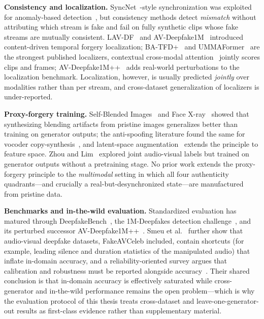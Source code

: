 \textbf{Consistency and localization.} SyncNet~\cite{chung2016syncnet}-style
synchronization was exploited for anomaly-based detection~\cite{feng2023avanomaly},
but consistency methods detect \emph{mismatch} without attributing which stream
is fake and fail on fully synthetic clips whose fake streams are mutually
consistent. LAV-DF~\cite{cai2022lavdf} and
AV-Deepfake1M~\cite{cai2023avdeepfake1m} introduced content-driven temporal
forgery localization; BA-TFD+~\cite{cai2023batfdplus} and
UMMAFormer~\cite{zhang2023ummaformer} are the strongest published localizers,
contextual cross-modal attention~\cite{katamneni2024contextual} jointly scores
clips and frames; AV-Deepfake1M++~\cite{cai2025avdeepfake1mpp} adds real-world
perturbations to the localization benchmark.
Localization, however, is usually predicted \emph{jointly} over modalities
rather than per stream, and cross-dataset generalization of localizers is
under-reported.

\textbf{Proxy-forgery training.} Self-Blended Images~\cite{shiohara2022sbi} and
Face X-ray~\cite{li2020facexray} showed that synthesizing blending artifacts
from pristine images generalizes better than training on generator outputs; the
anti-spoofing literature found the same for vocoder
copy-synthesis~\cite{wang2023vocoded}, and latent-space
augmentation~\cite{yan2024lsda} extends the principle to feature space.
Zhou and Lim~\cite{zhou2021joint} explored joint audio-visual labels but
trained on generator outputs without a pretraining stage. No prior work
extends the proxy-forgery principle to the \emph{multimodal} setting in which
all four authenticity quadrants---and crucially a real-but-desynchronized
state---are manufactured from pristine data.

\textbf{Benchmarks and in-the-wild evaluation.} Standardized evaluation has
matured through DeepfakeBench~\cite{yan2023deepfakebench}, the 1M-Deepfakes
detection challenge~\cite{cai2024challenge}, and its perturbed successor
AV-Deepfake1M++~\cite{cai2025avdeepfake1mpp}. Smeu et
al.~\cite{smeu2025shortcuts} further show that audio-visual deepfake datasets,
FakeAVCeleb included, contain shortcuts (for example, leading silence and
duration statistics of the manipulated audio) that inflate in-domain
accuracy, and a reliability-oriented survey argues that calibration and
robustness must be reported alongside accuracy~\cite{wang2024reliabilitysurvey}.
Their shared conclusion is
that in-domain accuracy is effectively saturated while cross-generator and
in-the-wild performance remains the open problem---which is why the
evaluation protocol of this thesis treats cross-dataset and
leave-one-generator-out results as first-class evidence rather than
supplementary material.

